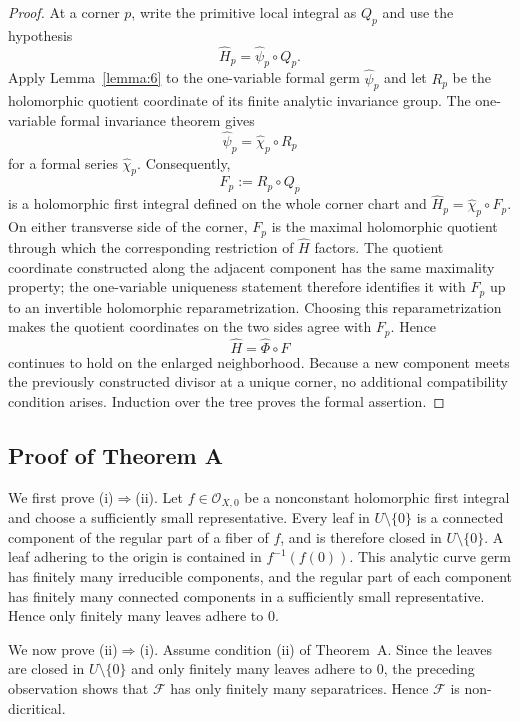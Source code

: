 \documentclass[11pt,twoside]{amsart}
\newcommand{\OO}{\mathcal O}
\newcommand{\F}{\mathcal F}
\theoremstyle{definition}
\begin{document}
\begin{proof}
At a corner $p$, write the primitive local integral as $Q_p$ and use the
hypothesis
\[
\widehat H_p=\widehat\psi_p\circ Q_p.
\]
Apply Lemma~\ref{lemma:6} to the one-variable formal germ
$\widehat\psi_p$ and let $R_p$ be the holomorphic quotient coordinate of
its finite analytic invariance group. The one-variable formal invariance
theorem gives
\[
 \widehat\psi_p=\widehat\chi_p\circ R_p
\]
for a formal series $\widehat\chi_p$. Consequently,
\[
 F_p:=R_p\circ Q_p
\]
is a holomorphic first integral defined on the whole corner chart and
$\widehat H_p=\widehat\chi_p\circ F_p$. On either transverse side of the
corner, $F_p$ is the maximal holomorphic quotient through which the
corresponding restriction of $\widehat H$ factors. The quotient coordinate
constructed along the adjacent component has the same maximality property;
the one-variable uniqueness statement
\cite[Chapter~I, Proposition~1.2]{MatteiMoussu1980} therefore identifies it
with $F_p$ up to an invertible holomorphic reparametrization. Choosing this
reparametrization makes the quotient coordinates on the two sides agree
with $F_p$. Hence
\[
\widehat H=\widehat\Phi\circ F
\]
continues to hold on the enlarged neighborhood. Because a new component
meets the previously constructed divisor at a unique corner, no additional
compatibility condition arises. Induction over the tree proves the formal
assertion.
\end{proof}

\subsection{Proof of Theorem A}

We first prove \textup{(i)$\Rightarrow$(ii)}. Let
$f\in\OO_{X,0}$ be a nonconstant holomorphic first integral and choose a
sufficiently small representative. Every leaf in $U\setminus\{0\}$ is a
connected component of the regular part of a fiber of $f$, and is therefore
closed in $U\setminus\{0\}$. A leaf adhering to the origin is contained in
$f^{-1}(f(0))$. This analytic curve germ has finitely many irreducible
components, and the regular part of each component has finitely many
connected components in a sufficiently small representative. Hence only
finitely many leaves adhere to $0$.

We now prove \textup{(ii)$\Rightarrow$(i)}.
Assume condition \textup{(ii)} of Theorem~A. Since the leaves are closed in $U\setminus\{0\}$ and only finitely many leaves adhere to $0$, the preceding observation shows that $\F$ has only finitely many separatrices. Hence $\F$ is non-dicritical.
\end{document}
